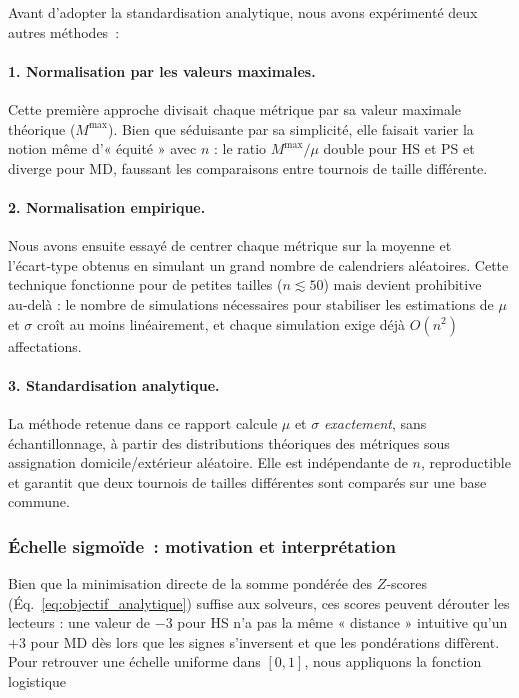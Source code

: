 \documentclass[11pt, a4paper]{article}
\begin{document}
Avant d'adopter la standardisation analytique, nous avons expérimenté deux autres méthodes :

\paragraph{1. Normalisation par les valeurs maximales.}
Cette première approche divisait chaque métrique par sa valeur maximale théorique ($M^\text{max}$). Bien que séduisante par sa simplicité, elle faisait varier la notion même d’« équité » avec $n$ : le ratio $M^\text{max}/\mu$ double pour HS et PS et diverge pour MD, faussant les comparaisons entre tournois de taille différente.

\paragraph{2. Normalisation empirique.}
Nous avons ensuite essayé de centrer chaque métrique sur la moyenne et l'écart‑type obtenus en simulant un grand nombre de calendriers aléatoires. Cette technique fonctionne pour de petites tailles ($n\lesssim 50$) mais devient prohibitive au‑delà : le nombre de simulations nécessaires pour stabiliser les estimations de $\mu$ et $\sigma$ croît au moins linéairement, et chaque simulation exige déjà $O(n^2)$ affectations.

\paragraph{3. Standardisation analytique.}
La méthode retenue dans ce rapport calcule $\mu$ et $\sigma$ \emph{exactement}, sans échantillonnage, à partir des distributions théoriques des métriques sous assignation domicile/extérieur aléatoire. Elle est indépendante de $n$, reproductible et garantit que deux tournois de tailles différentes sont comparés sur une base commune.

\bigskip

\subsubsection{Échelle sigmoïde : motivation et interprétation}

Bien que la minimisation directe de la somme pondérée des $Z$‑scores (Éq.~\ref{eq:objectif_analytique}) suffise aux solveurs, ces scores peuvent dérouter les lecteurs : une valeur de $-3$ pour HS n’a pas la même « distance » intuitive qu’un $+3$ pour MD dès lors que les signes s’inversent et que les pondérations diffèrent.
Pour retrouver une échelle uniforme dans $[0,1]$, nous appliquons la fonction logistique
\end{document}
